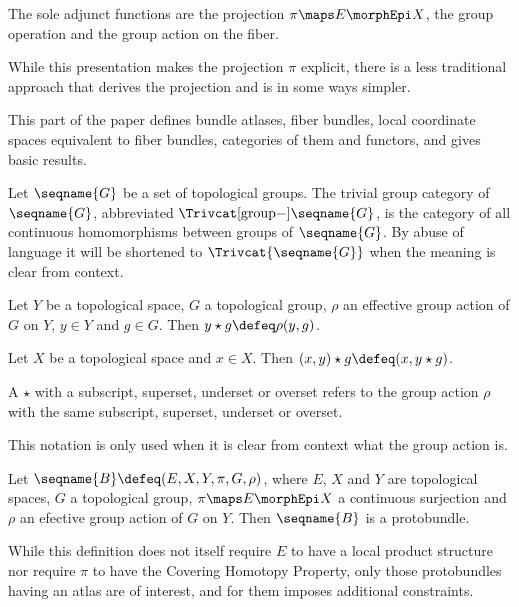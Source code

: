 \documentclass{article}
\begin{document}
The sole adjunct functions are the projection $\pi \maps E \morphEpi X$, the
group operation and the group action on the fiber.

\begin{remark}
While this presentation makes the projection $\pi$ explicit, there is a
less traditional approach that derives the projection and is in some
ways simpler.
\end{remark}

This part of the paper defines bundle atlases, fiber bundles, local
coordinate spaces equivalent to fiber bundles, categories of them and
functors, and gives basic results.

\begin{definition}
Let $\seqname{G}$ be a set of topological groups. The trivial group
category of $\seqname{G}$, abbreviated
$\Trivcat[\mathrm{group}-]{\seqname{G}}$, is the category of all
continuous homomorphisms between groups of $\seqname{G}$. By abuse of
language it will be shortened to $\Trivcat{\seqname{G}}$ when the
meaning is clear from context.
\end{definition}

\begin{definition}
Let $Y$ be a topological space, $G$ a topological group, $\rho$ an
effective group action of $G$ on $Y$, $y \in Y$ and $g \in G$. Then
$y \star g \defeq \rho(y,g)$.

Let $X$ be a topological space and $x \in X$. Then
$(x, y) \star g \defeq (x, y \star g)$.

A $\star$ with a subscript, superset, underset or overset refers to the
group action $\rho$ with the same subscript, superset, underset or
overset.

\begin{remark}
This notation is only used when it is clear from context what the group
action is.
\end{remark}
\end{definition}

\begin{definition}[Protobundles]
\label{def:ProtoBun}
Let $\seqname{B} \defeq (E, X, Y, \pi, G, \rho)$, where $E$, $X$ and $Y$
are topological spaces, $G$ a topological group, $\pi \maps E \morphEpi X$ a
continuous surjection and $\rho$ an efective group action of $G$ on $Y$.
Then $\seqname{B}$ is a protobundle.
\begin{remark}
While this definition does not itself require $E$ to have a local product
structure nor require $\pi$
to have the Covering Homotopy Property, only those protobundles having
an atlas are of interest, and for them  imposes
additional constraints.
\end{remark}
\end{definition}
\end{document}
